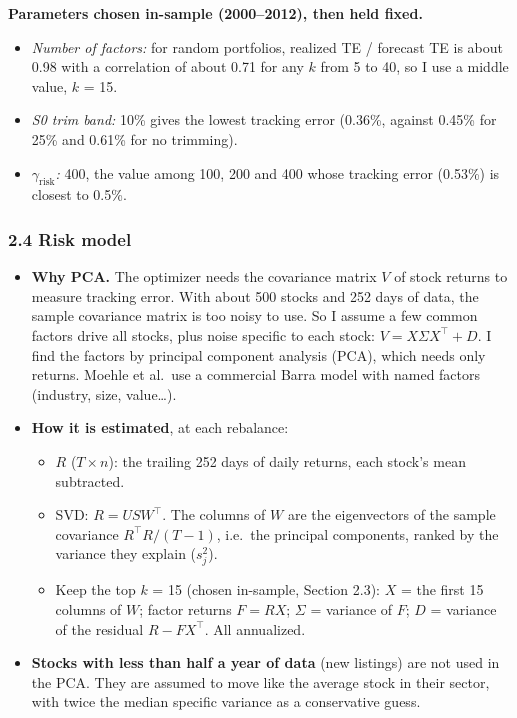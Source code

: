 \documentclass[
  11pt,
]{article}
\providecommand{\tightlist}{%
  \setlength{\itemsep}{0pt}\setlength{\parskip}{0pt}}
\begin{document}
\textbf{Parameters chosen in-sample (2000--2012), then held fixed.}

\begin{itemize}
\tightlist
\item
  \emph{Number of factors:} for random portfolios, realized TE / forecast TE is about 0.98 with a correlation of about 0.71 for any \(k\) from 5 to 40, so I use a middle value, \(k\) = 15.
\item
  \emph{S0 trim band:} 10\% gives the lowest tracking error (0.36\%, against 0.45\% for 25\% and 0.61\% for no trimming).
\item
  \emph{\(\gamma_{\text{risk}}\):} 400, the value among 100, 200 and 400 whose tracking error (0.53\%) is closest to 0.5\%.
\end{itemize}

\hypertarget{risk-model}{%
\subsubsection{2.4 Risk model}\label{risk-model}}

\begin{itemize}
\tightlist
\item
  \textbf{Why PCA.} The optimizer needs the covariance matrix \(V\) of stock returns to measure tracking error. With about 500 stocks and 252 days of data, the sample covariance matrix is too noisy to use. So I assume a few common factors drive all
  stocks, plus noise specific to each stock: \(V = X\Sigma X^\top + D\). I find the factors by principal component analysis (PCA), which needs only returns. Moehle et al.~use a commercial Barra model with named factors (industry, size, value\ldots).
\item
  \textbf{How it is estimated}, at each rebalance:

  \begin{itemize}
  \tightlist
  \item
    \(R\) (\(T \times n\)): the trailing 252 days of daily returns, each stock's mean subtracted.
  \item
    SVD: \(R = U S W^\top\). The columns of \(W\) are the eigenvectors of the sample covariance \(R^\top R/(T-1)\), i.e.~the principal components, ranked by the variance they explain (\(s_j^2\)).
  \item
    Keep the top \(k\) = 15 (chosen in-sample, Section 2.3): \(X\) = the first 15 columns of \(W\); factor returns \(F = RX\); \(\Sigma\) = variance of \(F\); \(D\) = variance of the residual \(R - FX^\top\). All annualized.
  \end{itemize}
\item
  \textbf{Stocks with less than half a year of data} (new listings) are not used in the PCA. They are assumed to move like the average stock in their sector, with twice the median specific variance as a conservative guess.
\end{itemize}
\end{document}
